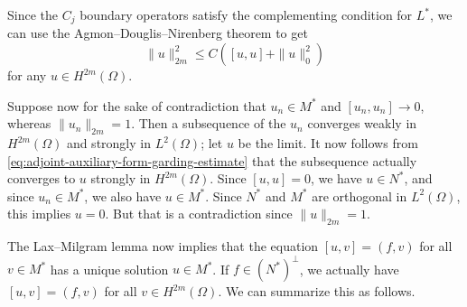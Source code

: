 \begin{Proof}
Since the $C_j$ boundary operators satisfy the complementing condition for $L^*$, we can use the Agmon--Douglis--Nirenberg theorem to get
\begin{equation}\label{eq:adjoint-auxiliary-form-garding-estimate}
\|u\|_{2m}^2\leq C([u,u]+\|u\|_0^2)
\end{equation}
for any $u\in H^{2m}(\Omega)$.

Suppose now for the sake of contradiction that $u_n\in M^*$ and $[u_n,u_n]\to0$, whereas $\|u_n\|_{2m}=1$. Then a subsequence of the $u_n$ converges weakly in $H^{2m}(\Omega)$ and strongly in $L^2(\Omega)$; let $u$ be the limit. It now follows from \eqref{eq:adjoint-auxiliary-form-garding-estimate} that the subsequence actually converges to $u$ strongly in $H^{2m}(\Omega)$. Since $[u,u]=0$, we have $u\in N^*$, and since $u_n\in M^*$, we also have $u\in M^*$. Since $N^*$ and $M^*$ are orthogonal in $L^2(\Omega)$, this implies $u=0$. But that is a contradiction since $\|u\|_{2m}=1$.
\end{Proof}

The Lax--Milgram lemma now implies that the equation $[u,v]=(f,v)$ for all $v\in M^*$ has a unique solution $u\in M^*$. If $f\in(N^*)^\perp$, we actually have $[u,v]=(f,v)$ for all $v\in H^{2m}(\Omega)$. We can summarize this as follows.
